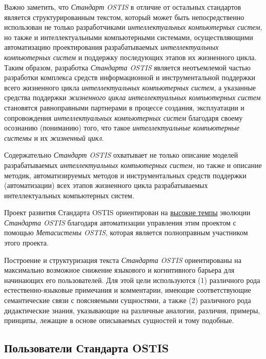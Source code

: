 Важно заметить, что \textit{Стандарт OSTIS} в отличие от остальных стандартов является структурированным  текстом, который может быть непосредственно использован не только разработчиками \textit{интеллектуальных компьютерных систем}, но также и интеллектуальными компьютерными системами, осуществляющими автоматизацию проектирования разрабатываемых \textit{интеллектуальных компьютерных систем} и поддержку последующих этапов их жизненного цикла. Таким образом, разработка \textit{Стандарта OSTIS} является неотъемлемой частью разработки комплекса средств информационной и инструментальной поддержки всего жизненного цикла \textit{интеллектуальных компьютерных систем}, а указанные средства поддержки \textit{жизненного цикла интеллектуальных компьютерных систем} становятся равноправными партнерами в процессе создания, эксплуатации и сопровождения \textit{интеллектуальных компьютерных систем} благодаря своему осознанию (пониманию) того, что такое \textit{интеллектуальные компьютерные системы} и их \textit{жизненный цикл}.

Содержательно \textit{Стандарт OSTIS} охватывает не только описание моделей разрабатываемых \textit{интеллектуальных компьютерных систем}, но также и описание методик, автоматизируемых методов и инструментальных средств поддержки (автоматизации) всех этапов жизненного цикла разрабатываемых интеллектуальных компьютерных систем.

Проект развития Стандарта OSTIS ориентирован на \uline{высокие темпы} эволюции \textit{Стандарта OSTIS} благодаря автоматизации управления этим проектом с помощью \textit{Метасистемы OSTIS}, которая является полноправным участником этого проекта.

Построение и структуризация текста \textit{Стандарта OSTIS} ориентированы на максимально возможное снижение языкового и когнитивного барьера для начинающих его пользователей. Для этой цели используются (1) различного рода естественно-языковые примечания и комментарии, имеющие соответствующие семантические связи с поясняемыми сущностями, а также (2) различного рода дидактические знания, указывающие на различные аналогии, различия, примеры, принципы, лежащие в основе описываемых сущностей и тому подобные.


\subsection{Пользователи Стандарта OSTIS}
\label{standard_users}

